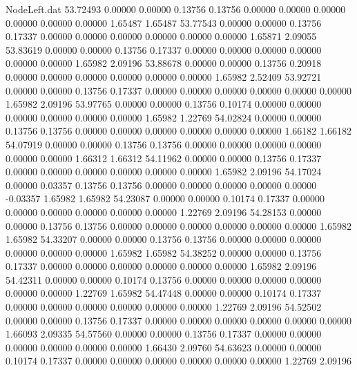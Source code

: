 \begin{filecontents}{NodeLeft.dat}
  53.72493    0.00000    0.00000     0.13756    0.13756    0.00000    0.00000    0.00000    0.00000    0.00000    0.00000    1.65487    1.65487
  53.77543    0.00000    0.00000     0.13756    0.17337    0.00000    0.00000    0.00000    0.00000    0.00000    0.00000    1.65871    2.09055
  53.83619    0.00000    0.00000     0.13756    0.17337    0.00000    0.00000    0.00000    0.00000    0.00000    0.00000    1.65982    2.09196
  53.88678    0.00000    0.00000     0.13756    0.20918    0.00000    0.00000    0.00000    0.00000    0.00000    0.00000    1.65982    2.52409
  53.92721    0.00000    0.00000     0.13756    0.17337    0.00000    0.00000    0.00000    0.00000    0.00000    0.00000    1.65982    2.09196
  53.97765    0.00000    0.00000     0.13756    0.10174    0.00000    0.00000    0.00000    0.00000    0.00000    0.00000    1.65982    1.22769
  54.02824    0.00000    0.00000     0.13756    0.13756    0.00000    0.00000    0.00000    0.00000    0.00000    0.00000    1.66182    1.66182
  54.07919    0.00000    0.00000     0.13756    0.13756    0.00000    0.00000    0.00000    0.00000    0.00000    0.00000    1.66312    1.66312
  54.11962    0.00000    0.00000     0.13756    0.17337    0.00000    0.00000    0.00000    0.00000    0.00000    0.00000    1.65982    2.09196
  54.17024    0.00000    0.03357     0.13756    0.13756    0.00000    0.00000    0.00000    0.00000    0.00000   -0.03357    1.65982    1.65982
  54.23087    0.00000    0.00000     0.10174    0.17337    0.00000    0.00000    0.00000    0.00000    0.00000    0.00000    1.22769    2.09196
  54.28153    0.00000    0.00000     0.13756    0.13756    0.00000    0.00000    0.00000    0.00000    0.00000    0.00000    1.65982    1.65982
  54.33207    0.00000    0.00000     0.13756    0.13756    0.00000    0.00000    0.00000    0.00000    0.00000    0.00000    1.65982    1.65982
  54.38252    0.00000    0.00000     0.13756    0.17337    0.00000    0.00000    0.00000    0.00000    0.00000    0.00000    1.65982    2.09196
  54.42311    0.00000    0.00000     0.10174    0.13756    0.00000    0.00000    0.00000    0.00000    0.00000    0.00000    1.22769    1.65982
  54.47448    0.00000    0.00000     0.10174    0.17337    0.00000    0.00000    0.00000    0.00000    0.00000    0.00000    1.22769    2.09196
  54.52502    0.00000    0.00000     0.13756    0.17337    0.00000    0.00000    0.00000    0.00000    0.00000    0.00000    1.66093    2.09335
  54.57560    0.00000    0.00000     0.13756    0.17337    0.00000    0.00000    0.00000    0.00000    0.00000    0.00000    1.66430    2.09760
  54.63623    0.00000    0.00000     0.10174    0.17337    0.00000    0.00000    0.00000    0.00000    0.00000    0.00000    1.22769    2.09196

\end{filecontents}
